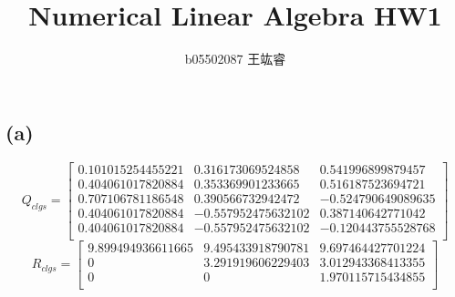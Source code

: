 \documentclass{article}
\title{Numerical Linear Algebra HW1}
\date{}
\author{b05502087 王竑睿}
\begin{document}
    \maketitle
    \section{}
    \section{}
    \section{}
    \section{}
        \subsection*{(a)}
            \begin{equation}
                Q_{clgs} = \left[
                \begin{array}{ccc}
                    0.101015254455221 &  0.316173069524858 &  0.541996899879457\\
                    0.404061017820884 &  0.353369901233665 &  0.516187523694721\\
                    0.707106781186548 &  0.390566732942472 & -0.524790649089635\\
                    0.404061017820884 & -0.557952475632102 &  0.387140642771042\\
                    0.404061017820884 & -0.557952475632102 & -0.120443755528768\\
                \end{array}
                \right]
            \end{equation}
            \begin{equation}
                R_{clgs} = \left[    
                \begin{array}{ccc}
                    9.899494936611665 &  9.495433918790781 &  9.697464427701224\\
                    0 &  3.291919606229403 &  3.012943368413355\\
                    0 &                  0 &  1.970115715434855\\
                \end{array}
                \right]
            \end{equation}
\end{document}
